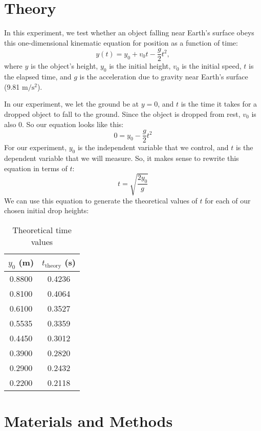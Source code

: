 \documentclass{article}
\begin{document}
\insertTitle

\section{Theory}

In this experiment, we test whether an object falling near Earth's surface obeys this one-dimensional kinematic equation for position as a function of time:
\begin{equation}\label{eq:kinematic}
    y(t) = y_0 + v_0t -\frac{g}{2}t^2,
\end{equation}
where $y$ is the object's height, $y_0$ is the initial height, $v_0$ is the initial speed, $t$ is the elapsed time, and $g$ is the acceleration due to gravity near Earth's surface (9.81 $\si{\m/\s^2}$).

In our experiment, we let the ground be at $y=0$, and $t$ is the time it takes for a dropped object to fall to the ground. Since the object is dropped from rest, $v_0$ is also 0. So our equation looks like this:
\[
    0 = y_0 -\frac{g}{2}t^2
\]
For our experiment, $y_0$ is the independent variable that we control, and $t$ is the dependent variable that we will measure. So, it makes sense to rewrite this equation in terms of $t$:
\begin{equation}\label{eq:test}
    t = \sqrt{\frac{2y_0}{g}}
\end{equation}
We can use this equation to generate the theoretical values of $t$ for each of our chosen initial drop heights:
\begin{table}[H]
    \centering
    \begin{tabular}{cc}
        \toprule
        $y_0$ (m) & $t_\text{theory}$ (s) \\
        \midrule        
        0.8800 & 0.4236 \\
        0.8100 & 0.4064 \\
        0.6100 & 0.3527 \\
        0.5535 & 0.3359 \\
        0.4450 & 0.3012 \\
        0.3900 & 0.2820 \\
        0.2900 & 0.2432 \\
        0.2200 & 0.2118 \\
        \bottomrule
    \end{tabular}
    \caption{Theoretical time values}
\end{table}

\section{Materials and Methods}
\end{document}
